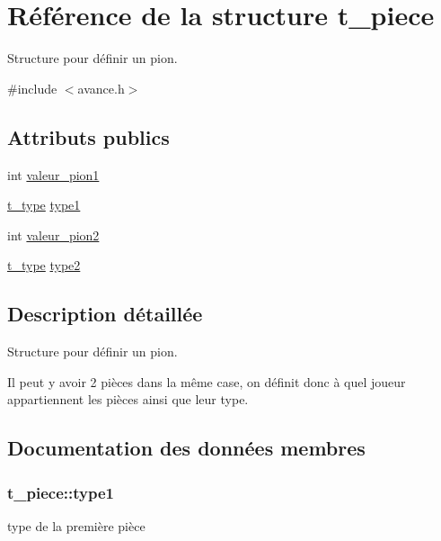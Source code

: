 \hypertarget{structt__piece}{}\section{Référence de la structure t\+\_\+piece}
\label{structt__piece}


Structure pour définir un pion.  




{\ttfamily \#include $<$avance.\+h$>$}

\subsection*{Attributs publics}
\begin{DoxyCompactItemize}
\item 
int \hyperlink{structt__piece_a2854e60853e81ec5cb32a0b4d42a2c8f}{valeur\+\_\+pion1}
\item 
\hyperlink{avance_8h_a61532cc2157d912259fdd9aa25ca6d70}{t\+\_\+type} \hyperlink{structt__piece_aac3600897bf80126700557d4df1c572a}{type1}
\item 
int \hyperlink{structt__piece_a072647ef6ac729981f55d043655f928f}{valeur\+\_\+pion2}
\item 
\hyperlink{avance_8h_a61532cc2157d912259fdd9aa25ca6d70}{t\+\_\+type} \hyperlink{structt__piece_ad48b124427fe8c945cee48b15f2a270b}{type2}
\end{DoxyCompactItemize}


\subsection{Description détaillée}
Structure pour définir un pion. 

Il peut y avoir 2 pièces dans la même case, on définit donc à quel joueur appartiennent les pièces ainsi que leur type. 

\subsection{Documentation des données membres}
\subsubsection[{\texorpdfstring{type1}{type1}}]{ t\+\_\+piece\+::type1}\hypertarget{structt__piece_aac3600897bf80126700557d4df1c572a}{}\label{structt__piece_aac3600897bf80126700557d4df1c572a}
type de la première pièce 
